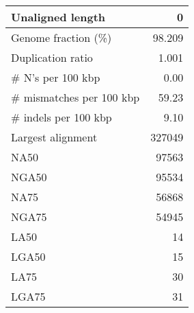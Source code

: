 \documentclass[12pt,a4paper]{article}
\begin{document}
\begin{table}[ht]
\begin{center}
\begin{tabular}{|l*{1}{|r}|}
Unaligned length & 0 \\ \hline
Genome fraction (\%) & 98.209 \\ \hline
Duplication ratio & 1.001 \\ \hline
\# N's per 100 kbp & 0.00 \\ \hline
\# mismatches per 100 kbp & 59.23 \\ \hline
\# indels per 100 kbp & 9.10 \\ \hline
Largest alignment & 327049 \\ \hline
NA50 & 97563 \\ \hline
NGA50 & 95534 \\ \hline
NA75 & 56868 \\ \hline
NGA75 & 54945 \\ \hline
LA50 & 14 \\ \hline
LGA50 & 15 \\ \hline
LA75 & 30 \\ \hline
LGA75 & 31 \\ \hline
\end{tabular}
\end{center}
\end{table}
\end{document}
